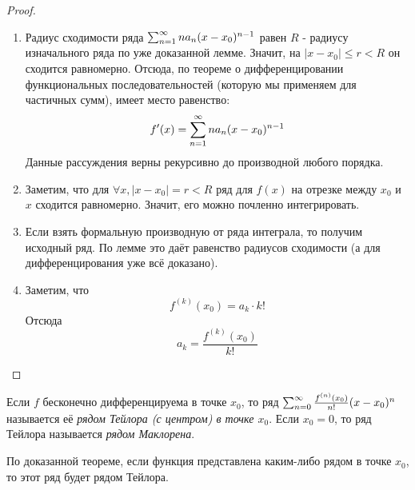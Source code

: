 \begin{proof}~
	\begin{enumerate}
		\item Радиус сходимости ряда $\sum_{n = 1}^\infty na_n(x - x_0)^{n - 1}$ равен $R$ - радиусу изначального ряда по уже доказанной лемме. Значит, на $|x - x_0| \le r < R$ он сходится равномерно. Отсюда, по теореме о дифференцировании функциональных последовательностей (которую мы применяем для частичных сумм), имеет место равенство:
		\[
			f'(x) = \sum\limits_{n = 1}^\infty na_n(x - x_0)^{n - 1}
		\]
		Данные рассуждения верны рекурсивно до производной любого порядка.
		
		\item Заметим, что для $\forall x, |x - x_0| = r < R$ ряд для $f(x)$ на отрезке между $x_0$ и $x$ сходится равномерно. Значит, его можно почленно интегрировать.
		
		\item Если взять формальную производную от ряда интеграла, то получим исходный ряд. По лемме это даёт равенство радиусов сходимости (а для дифференцирования уже всё доказано).
		
		\item Заметим, что
		\[
			f^{(k)}(x_0) = a_k \cdot k!
		\]
		Отсюда
		\[
			a_k = \frac{f^{(k)}(x_0)}{k!}
		\]
	\end{enumerate}
\end{proof}

\begin{definition}
	Если $f$ бесконечно дифференцируема в точке $x_0$, то ряд $\sum_{n = 0}^\infty \frac{f^{(n)}(x_0)}{n!}(x - x_0)^n$ называется её \textit{рядом Тейлора (с центром) в точке $x_0$}. Если $x_0 = 0$, то ряд Тейлора называется \textit{рядом Маклорена}.
\end{definition}

\begin{note}
	По доказанной теореме, если функция представлена каким-либо рядом в точке $x_0$, то этот ряд будет рядом Тейлора.
\end{note}

